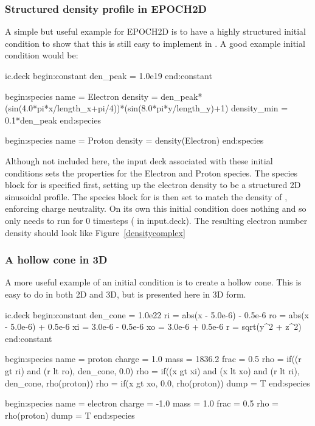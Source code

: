 \subsubsection{Structured density profile in EPOCH2D}


A simple but useful example for EPOCH2D is to have a highly structured initial
condition to show that this is still easy to implement in {\EPOCH}. A good
example initial condition would be:
\begin{lboxverbatim}{ic.deck}
begin:constant
  den_peak = 1.0e19
end:constant

begin:species
  name = Electron
  density = den_peak*(sin(4.0*pi*x/length_x+pi/4))*(sin(8.0*pi*y/length_y)+1)
  density_min = 0.1*den_peak
end:species

begin:species
  name = Proton
  density = density(Electron)
end:species
\end{lboxverbatim}

Although not included here, the input deck associated with these initial
conditions sets the properties for the Electron and Proton species.
The species block for  is specified
first, setting up the electron density to be a structured 2D sinusoidal
profile. The species block for  is then set to
match the density of , enforcing charge neutrality. On
its own this initial condition does nothing and so only needs to run for 0
timesteps ( in input.deck). The resulting electron number
density should look like Figure~\ref{densitycomplex}

\subsubsection{A hollow cone in 3D}
A more useful example of an initial condition is to create a hollow cone. This
is easy to do in both 2D and 3D, but is presented here in 3D form.
\begin{lboxverbatim}{ic.deck}
begin:constant
  den_cone = 1.0e22
  ri = abs(x - 5.0e-6) - 0.5e-6
  ro = abs(x - 5.0e-6) + 0.5e-6
  xi = 3.0e-6 - 0.5e-6
  xo = 3.0e-6 + 0.5e-6
  r = sqrt(y^2 + z^2)
end:constant

begin:species
  name = proton
  charge = 1.0
  mass = 1836.2
  frac = 0.5
  rho = if((r gt ri) and (r lt ro), den_cone, 0.0)
  rho = if((x gt xi) and (x lt xo) and (r lt ri), den_cone, rho(proton))
  rho = if(x gt xo, 0.0, rho(proton))
  dump = T
end:species

begin:species
  name = electron
  charge = -1.0
  mass = 1.0
  frac = 0.5
  rho = rho(proton)
  dump = T
end:species
\end{lboxverbatim}


